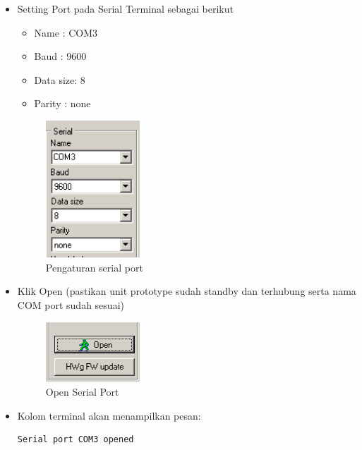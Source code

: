 \documentclass{article}
\begin{document}
\begin{enumerate}
\begin{itemize}
			\item Setting Port pada Serial Terminal sebagai berikut
			\begin{itemize}
				\item Name     : COM3
				\item Baud     : 9600
				\item Data size: 8
				\item Parity   : none
			\end{itemize}

			\begin{figure}[H]
				\centering
				\includegraphics[width=100pt]{images/software/hercules_port}
				\caption{Pengaturan serial port}
			\end{figure}

			\item Klik Open (pastikan unit prototype sudah standby dan terhubung
			serta nama COM port sudah sesuai)

			\begin{figure}[H]
				\centering
				\includegraphics[width=100pt]{images/software/hercules_open}
				\caption{Open Serial Port}
			\end{figure}

			\item Kolom terminal akan menampilkan pesan:
			\begin{verbatim}
Serial port COM3 opened
			\end{verbatim}


\end{itemize}
\end{enumerate}
\end{document}

